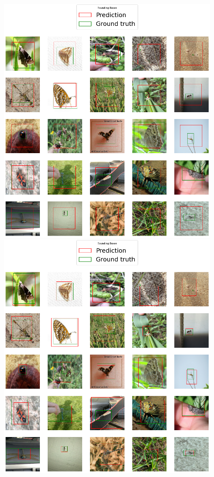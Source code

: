 \begin{figure}[!ht]
    \centering
    \begin{minipage}{.45\textwidth}
    \includegraphics[width=\textwidth]{images/regression-mobilenet-raw.png}
    \end{minipage}
    \hfill
    \begin{minipage}{.45\textwidth}
    \includegraphics[width=\textwidth]{images/regression-mobilenet-augmented.png}

\end{minipage}
\end{figure}
